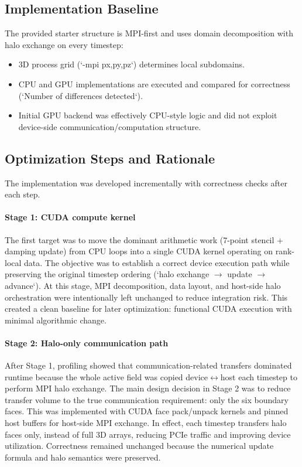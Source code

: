 \documentclass[11pt]{article}
\begin{document}
\subsection{Implementation Baseline}
The provided starter structure is MPI-first and uses domain decomposition with halo exchange on every timestep:
\begin{itemize}[leftmargin=*]
\item 3D process grid (`-mpi px,py,pz`) determines local subdomains.
\item CPU and GPU implementations are executed and compared for correctness (`Number of differences detected`).
\item Initial GPU backend was effectively CPU-style logic and did not exploit device-side communication/computation structure.
\end{itemize}

\subsection{Optimization Steps and Rationale}
The implementation was developed incrementally with correctness checks after each step.

\paragraph{Stage 1: CUDA compute kernel}
The first target was to move the dominant arithmetic work (7-point stencil + damping update) from CPU loops into a single CUDA kernel operating on rank-local data. The objective was to establish a correct device execution path while preserving the original timestep ordering (`halo exchange \(\rightarrow\) update \(\rightarrow\) advance`). At this stage, MPI decomposition, data layout, and host-side halo orchestration were intentionally left unchanged to reduce integration risk. This created a clean baseline for later optimization: functional CUDA execution with minimal algorithmic change.

\paragraph{Stage 2: Halo-only communication path}
After Stage 1, profiling showed that communication-related transfers dominated runtime because the whole active field was copied device$\leftrightarrow$host each timestep to perform MPI halo exchange. The main design decision in Stage 2 was to reduce transfer volume to the true communication requirement: only the six boundary faces. This was implemented with CUDA face pack/unpack kernels and pinned host buffers for host-side MPI exchange. In effect, each timestep transfers halo faces only, instead of full 3D arrays, reducing PCIe traffic and improving device utilization. Correctness remained unchanged because the numerical update formula and halo semantics were preserved.
\end{document}
